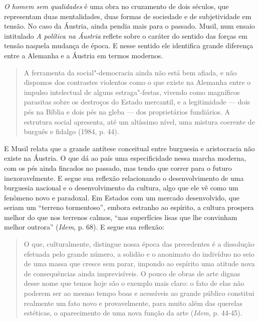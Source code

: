 \emph{O homem sem qualidades} é uma obra no cruzamento de dois séculos,
que representam duas mentalidades, duas formas de sociedade e de
subjetividade em tensão. No caso da Áustria, ainda pendia
mais para o passado. Musil, num ensaio intitulado \emph{A política na
Áustria} reflete sobre o caráter do sentido das forças em tensão naquela
mudança de época. E nesse sentido ele identifica grande diferença entre
a Alemanha e a Áustria em termos modernos.

\begin{quote}
A ferramenta da social"-democracia ainda não está bem afiada, e não
dispomos dos contrastes violentos como o que existe na Alemanha entre o
impulso intelectual de alguns estraga"-festas, vivendo como magníficos
parasitas sobre os destroços do Estado mercantil, e a legitimidade ---
dois pés na Bíblia e dois pés na gleba --- dos proprietários fundiários.
A estrutura social apresenta, até um altíssimo nível, uma mistura
coerente de burguês e fidalgo (1984, p. 44).
\end{quote}

E Musil relata que a grande antítese conceitual entre burguesia e
aristocracia não existe na Áustria. O que dá ao país uma especificidade
nessa marcha moderna, com os pés ainda fincados no passado, mas tendo
que correr para o futuro inexoravelmente. E segue sua reflexão
relacionando o desenvolvimento de uma burguesia nacional e o
desenvolvimento da cultura, algo que ele vê como um fenômeno novo e
paradoxal. Em Estados com um mercado desenvolvido, que seriam um
``terreno tormentoso'', embora estranho ao espírito, a cultura prospera
melhor do que nos terrenos calmos, ``nas superfícies lisas que lhe
convinham melhor outrora'' (\emph{Idem}, p. 68). E segue sua reflexão:

\begin{quote}
O que, culturalmente, distingue nossa época das precedentes é a
dissolução efetuada pelo grande número, a solidão e o anonimato do
indivíduo no seio de uma massa que cresce sem parar, impondo ao espírito
uma atitude nova de consequências ainda imprevisíveis. O pouco de obras
de arte dignas desse nome que temos hoje são o exemplo mais claro: o
fato de elas não poderem ser ao mesmo tempo boas e acessíveis ao grande
público constitui realmente um fato novo e provavelmente, para muito
além das querelas estéticas, o aparecimento de uma nova função da
arte (\emph{Idem}, p. 44-45).
\end{quote}

